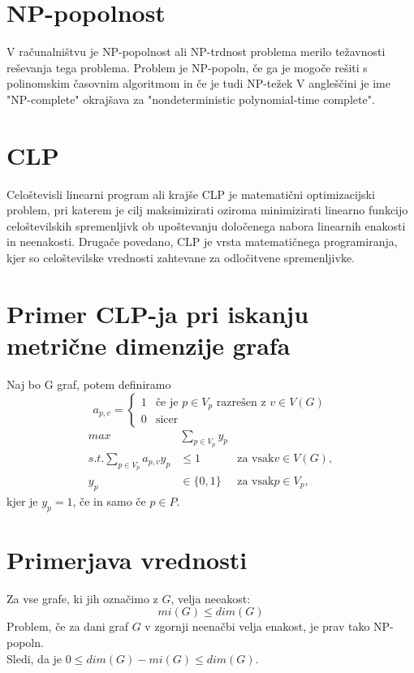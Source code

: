 \documentclass[a4paper]{article}
\begin{document}
\section{NP-popolnost}
V računalništvu je NP-popolnost ali NP-trdnost problema merilo težavnosti reševanja tega problema. Problem je NP-popoln, če ga je mogoče rešiti s polinomskim časovnim algoritmom in če je tudi NP-težek
V angleščini je ime "NP-complete" okrajšava za "nondeterministic polynomial-time complete". 

\section{CLP}
Celoštevisli linearni program ali krajše CLP je matematični optimizacijski 
problem, pri katerem je cilj maksimizirati oziroma minimizirati linearno 
funkcijo celoštevilskih spremenljivk ob upoštevanju določenega nabora 
linearnih enakosti in neenakosti.
Drugače povedano, CLP je vrsta matematičnega programiranja, kjer so 
celoštevilske vrednosti zahtevane za odločitvene spremenljivke.

\section{Primer CLP-ja pri iskanju metrične dimenzije grafa}
Naj bo G graf, potem definiramo 
\begin{equation} 
  a_{p,v} =
    \begin{cases}
      1& \text{če je $p \in V_{p}$ razrešen z $v \in V(G)$}\\
      0& \text{sicer}
    \end{cases}       
\end{equation}
\begin{align}
max &\sum_{p \in V_{p}} y_{p} &\\ \nonumber
    s.t. \sum_{p \in V_{p}} a_{p,v}y_{p} & \leq 1 &\text{za vsak} v \in V(G), \\ \nonumber
    y_{p} & \in \{0,1\} &\text{za vsak} p \in V_{p}, \nonumber
\end{align}
kjer je $y_{p}=1$, če in samo če $p \in P$.

\section{Primerjava vrednosti}
Za vse grafe, ki jih označimo z $G$, velja neeakost:
$$mi(G) \leq dim(G)$$
Problem, če za dani graf $G$ v zgornji neenačbi velja enakost, je prav tako NP-popoln. \\
Sledi, da je $0 \leq dim(G)-mi(G) \leq dim(G)$.\\
\end{document}
